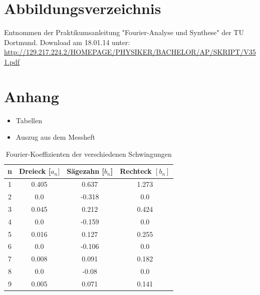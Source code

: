 \documentclass[11pt,ngerman,a4paper]{article}
\begin{document}
\section{Abbildungsverzeichnis}
\begin{enumerate}[{[}1{]}]
\item Entnommen der Praktikumsanleitung "Fourier-Analyse und Synthese" der TU Dortmund. Download am 18.01.14 unter:\\
 \url{http://129.217.224.2/HOMEPAGE/PHYSIKER/BACHELOR/AP/SKRIPT/V351.pdf}
\end{enumerate}
\section{Anhang}
\begin{itemize}
\item Tabellen
\item Auszug aus dem Messheft
\end{itemize}

\newpage
\begin{table}
\centering
\begin{tabular}{|c|c|c|c|}

\hline
n & Dreieck [$a_n]$ & S\"agezahn [$b_n$] & Rechteck $[b_n]$ \\
\hline
1 & 0.405 & 0.637 & 1.273\\
2 & 0.0 & -0.318 & 0.0\\
3 & 0.045 & 0.212 & 0.424\\
4 & 0.0 & -0.159 & 0.0\\
5 & 0.016 & 0.127 & 0.255\\
6 & 0.0 & -0.106 & 0.0\\
7 & 0.008 & 0.091 & 0.182\\
8 & 0.0 & -0.08 & 0.0\\
9 & 0.005 & 0.071 & 0.141\\
\hline
\end{tabular}
\label{table1}
\caption{Fourier-Koeffizienten der verschiedenen Schwingungen}
\end{table}
\end{document}
